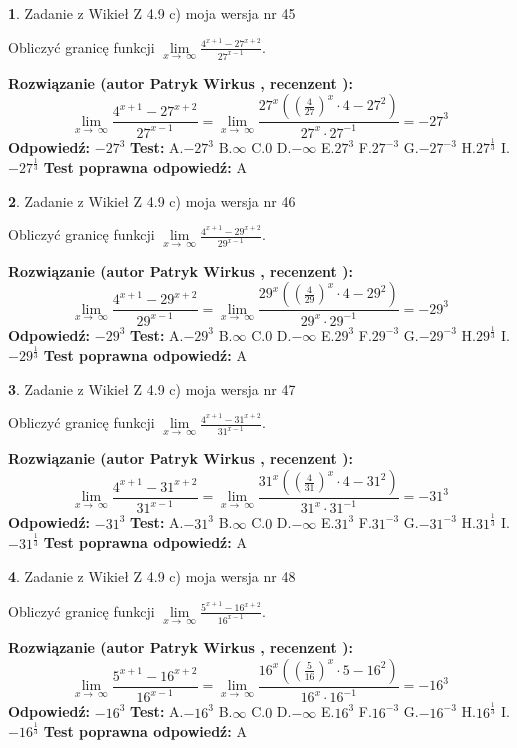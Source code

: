 \documentclass[12pt, a4paper]{article}
\theoremstyle{definition} %
\newtheorem{zad}{}
\newcommand{\zadStart}[1]{\begin{zad}#1\newline}
\newcommand{\zadStop}{\end{zad}}
\newcommand{\rozwStart}[2]{\noindent \textbf{Rozwiązanie (autor #1 , recenzent #2): }\newline}
\newcommand{\rozwStop}{\newline}
\newcommand{\odpStart}{\noindent \textbf{Odpowiedź:}\newline}
\newcommand{\odpStop}{\newline}
\newcommand{\testStart}{\noindent \textbf{Test:}\newline}
\newcommand{\testStop}{\newline}
\newcommand{\kluczStart}{\noindent \textbf{Test poprawna odpowiedź:}\newline}
\newcommand{\kluczStop}{\newline}
\begin{document}
\zadStart{Zadanie z Wikieł Z 4.9 c) moja wersja nr 45}


Obliczyć granicę funkcji  $\lim\limits_{x\to\ \infty}\frac{4^{x+1}-27^{x+2}}{27^{x-1}}$.
\zadStop
\rozwStart{Patryk Wirkus}{}
$$\lim\limits_{x\to\ \infty}\frac{4^{x+1}-27^{x+2}}{27^{x-1}}=\lim\limits_{x\to\ \infty}\frac{27^{x}((\frac{4}{27})^{x}\cdot 4 -27^{2})}{27^{x}\cdot 27^{-1}} = -27^{3}$$
\rozwStop
\odpStart
$-27^{3}$
\odpStop
\testStart
A.$-27^{3}$ B.$\infty$ C.$0$ D.$-\infty$ E.$27^{3}$
F.$27^{-3}$ G.$-27^{-3}$
H.$27^{\frac{1}{3}}$
I.$-27^{\frac{1}{3}}$
\testStop
\kluczStart
A
\kluczStop



\zadStart{Zadanie z Wikieł Z 4.9 c) moja wersja nr 46}


Obliczyć granicę funkcji  $\lim\limits_{x\to\ \infty}\frac{4^{x+1}-29^{x+2}}{29^{x-1}}$.
\zadStop
\rozwStart{Patryk Wirkus}{}
$$\lim\limits_{x\to\ \infty}\frac{4^{x+1}-29^{x+2}}{29^{x-1}}=\lim\limits_{x\to\ \infty}\frac{29^{x}((\frac{4}{29})^{x}\cdot 4 -29^{2})}{29^{x}\cdot 29^{-1}} = -29^{3}$$
\rozwStop
\odpStart
$-29^{3}$
\odpStop
\testStart
A.$-29^{3}$ B.$\infty$ C.$0$ D.$-\infty$ E.$29^{3}$
F.$29^{-3}$ G.$-29^{-3}$
H.$29^{\frac{1}{3}}$
I.$-29^{\frac{1}{3}}$
\testStop
\kluczStart
A
\kluczStop



\zadStart{Zadanie z Wikieł Z 4.9 c) moja wersja nr 47}


Obliczyć granicę funkcji  $\lim\limits_{x\to\ \infty}\frac{4^{x+1}-31^{x+2}}{31^{x-1}}$.
\zadStop
\rozwStart{Patryk Wirkus}{}
$$\lim\limits_{x\to\ \infty}\frac{4^{x+1}-31^{x+2}}{31^{x-1}}=\lim\limits_{x\to\ \infty}\frac{31^{x}((\frac{4}{31})^{x}\cdot 4 -31^{2})}{31^{x}\cdot 31^{-1}} = -31^{3}$$
\rozwStop
\odpStart
$-31^{3}$
\odpStop
\testStart
A.$-31^{3}$ B.$\infty$ C.$0$ D.$-\infty$ E.$31^{3}$
F.$31^{-3}$ G.$-31^{-3}$
H.$31^{\frac{1}{3}}$
I.$-31^{\frac{1}{3}}$
\testStop
\kluczStart
A
\kluczStop



\zadStart{Zadanie z Wikieł Z 4.9 c) moja wersja nr 48}


Obliczyć granicę funkcji  $\lim\limits_{x\to\ \infty}\frac{5^{x+1}-16^{x+2}}{16^{x-1}}$.
\zadStop
\rozwStart{Patryk Wirkus}{}
$$\lim\limits_{x\to\ \infty}\frac{5^{x+1}-16^{x+2}}{16^{x-1}}=\lim\limits_{x\to\ \infty}\frac{16^{x}((\frac{5}{16})^{x}\cdot 5 -16^{2})}{16^{x}\cdot 16^{-1}} = -16^{3}$$
\rozwStop
\odpStart
$-16^{3}$
\odpStop
\testStart
A.$-16^{3}$ B.$\infty$ C.$0$ D.$-\infty$ E.$16^{3}$
F.$16^{-3}$ G.$-16^{-3}$
H.$16^{\frac{1}{3}}$
I.$-16^{\frac{1}{3}}$
\testStop
\kluczStart
A
\kluczStop
\end{document}
